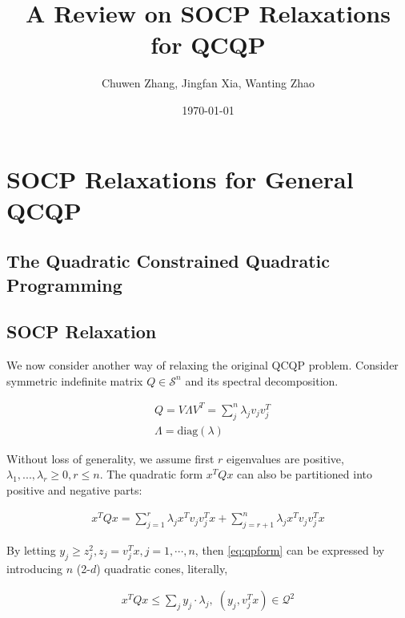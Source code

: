 \documentclass[../main]{subfiles}
\title{A Review on SOCP Relaxations for QCQP}
\author{Chuwen Zhang, Jingfan Xia, Wanting Zhao}
\date{\today}
\begin{document}
\maketitle
{
  \setcounter{tocdepth}{3}
  \tableofcontents
}

\section{SOCP Relaxations for General QCQP}

\subsection{The Quadratic Constrained Quadratic Programming}

\subsection{SOCP Relaxation}

We now consider another way of relaxing the original QCQP problem. Consider symmetric indefinite matrix \(Q \in \mathcal{S}^n\) and its spectral decomposition.

\begin{equation}
  \begin{aligned}
     & Q = V\Lambda V ^T =\sum_j^n \lambda_j v_j  v_j^T \\
     & \Lambda = \mathrm{diag}(\lambda)
  \end{aligned}
\end{equation}

Without loss of generality, we assume first \(r\) eigenvalues are positive, \(\lambda_1, ..., \lambda_r \ge 0, r\le n \). The quadratic form \(x^TQx\) can also be partitioned into positive and negative parts:

\begin{equation}\label{eq:qpform}
  \begin{aligned}
    x^TQx = \sum_{j=1}^r \lambda_j x^T v_j v_j^T x + \sum_{j=r+1}^n \lambda_j x^T v_j v_j^T x
  \end{aligned}
\end{equation}

By letting \(y_j \ge z_j^2, z_j = v_j^T x, j = 1, \cdots, n\), then \eqref{eq:qpform} can be expressed by introducing \(n\) (2-\(d\)) quadratic cones, literally,

\begin{equation}
  \begin{aligned}
    x^TQx \le \sum_j y_j \cdot \lambda_j,\; (y_j, v^T_j x) \in \mathcal{Q}^2
  \end{aligned}
\end{equation}
\end{document}
